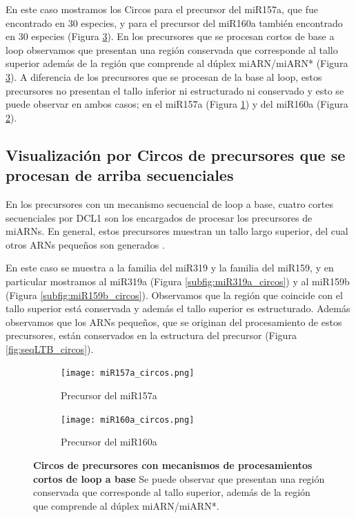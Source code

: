 En este caso mostramos los Circos para el precursor del miR157a, que fue encontrado en 30 especies, y para el precursor del miR160a también encontrado en 30 especies (Figura \ref{fig:srLTB_circos}). 
En los precursores que se procesan cortos de base a loop observamos que presentan una región conservada que corresponde al tallo superior además de la región que comprende al dúplex miARN/miARN* (Figura \ref{fig:srLTB_circos}).
A diferencia de los precursores que se procesan de la base al loop, estos precursores no presentan el tallo inferior ni estructurado ni conservado y esto se puede observar en ambos casos; en el miR157a (Figura \ref{subfig:miR157a_circos}) y del miR160a (Figura \ref{subfig:miR160a_circos}).


\subsection{Visualización por Circos de precursores que se procesan de arriba secuenciales}

En los precursores con un mecanismo secuencial de loop a base, cuatro cortes secuenciales por DCL1 son los encargados de procesar los precursores de miARNs.
En general, estos precursores muestran un tallo largo superior, del cual otros ARNs pequeños son generados \citep{pmid19850910,Bologna2009,Bologna2013}.

En este caso se muestra a la familia del miR319 y la familia del miR159, y en particular mostramos al miR319a (Figura \ref{subfig:miR319a_circos}) y al miR159b (Figura \ref{subfig:miR159b_circos}).
Observamos que la región que coincide con el tallo superior está conservada y además el tallo superior es estructurado.
Además observamos que los ARNs pequeños, que se originan del procesamiento de estos precursores, están conservados en la estructura del precursor (Figura \ref{fig:seqLTB_circos}).



\begin{landscape}
	\begin{figure}
	\centering
	\begin{subfigure}{.75\textwidth}
 \centering
 \texttt{[image: miR157a\_circos.png]}
 \caption{Precursor del miR157a}
 \label{subfig:miR157a_circos}
	\end{subfigure}%
	\begin{subfigure}{.75\textwidth}
 \centering
 \texttt{[image: miR160a\_circos.png]}
 \caption{Precursor del miR160a}
 \label{subfig:miR160a_circos}
	\end{subfigure}
      \caption[Circos de precursores con mecanismos de procesamientos cortos de loop a base]{
        \textbf{Circos de precursores con mecanismos de procesamientos cortos de loop a base}
        Se puede observar que presentan una región conservada que corresponde al tallo superior, además de la región que comprende al dúplex miARN/miARN*.
        }

	\label{fig:srLTB_circos}
	\end{figure}
\end{landscape}



